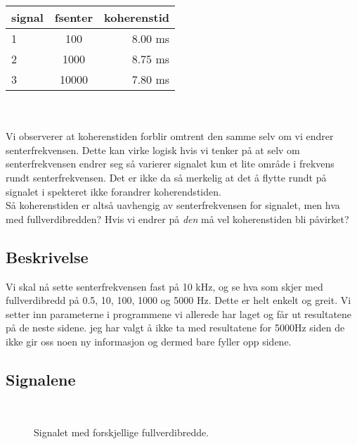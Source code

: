 \documentclass[12pt,norsk,a4paper]{article}
\begin{document}
\begin{tabular}{| l | c | r |}
 \hline
  signal & fsenter & koherenstid\\
 \hline
  1 & 100    	& 8.00 ms\\
  2 & 1000   	& 8.75 ms\\
  3 & 10000  	& 7.80 ms\\
 \hline
\end{tabular}\\
\\
Vi observerer at koherenstiden forblir omtrent den samme selv om vi endrer senterfrekvensen. Dette kan virke logisk hvis vi tenker på at selv om senterfrekvensen endrer seg så varierer signalet kun et lite område i frekvens rundt senterfrekvensen. Det er ikke da så merkelig at det å flytte rundt på signalet i spekteret ikke forandrer koherendstiden. \\Så koherenstiden er altså uavhengig av senterfrekvensen for signalet, men hva med fullverdibredden? Hvis vi endrer på \emph{den} må vel koherenstiden bli påvirket?

\subsection{Beskrivelse}
Vi skal nå sette senterfrekvensen fast på 10 kHz, og se hva som skjer med fullverdibredd på 0.5, 10, 100, 1000 og 5000 Hz. Dette er helt enkelt og greit. Vi setter inn parameterne i programmene vi allerede har laget og får ut resultatene på de neste sidene. jeg har valgt å ikke ta med resultatene for 5000Hz siden de ikke gir oss noen ny informasjon og dermed bare fyller opp sidene.

\subsection{Signalene}

\begin{figure}[H]
\begin{center}
\\ 
\noindent 
{}
\end{center}
\caption[caption]{Signalet med forskjellige fullverdibredde.} 
\end{figure}
\end{document}

